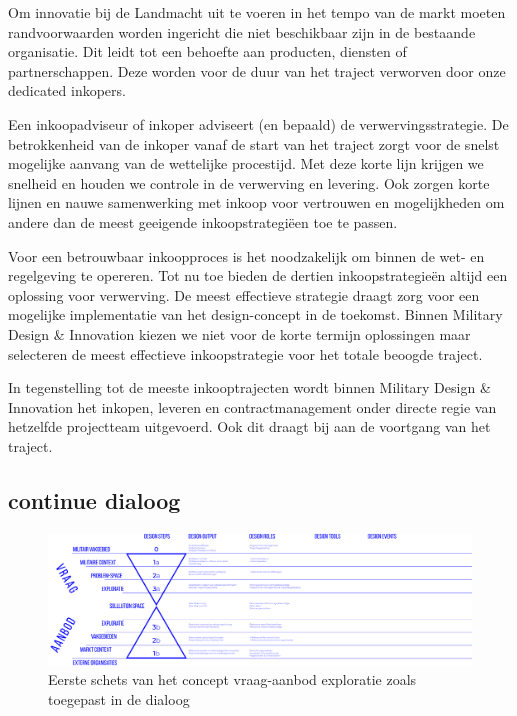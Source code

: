 \documentclass[
]{book}
\begin{document}
Om innovatie bij de Landmacht uit te voeren in het tempo van de markt moeten randvoorwaarden worden ingericht die niet beschikbaar zijn in de bestaande organisatie. Dit leidt tot een behoefte aan producten, diensten of partnerschappen. Deze worden voor de duur van het traject verworven door onze dedicated inkopers.

Een inkoopadviseur of inkoper adviseert (en bepaald) de verwervingsstrategie. De betrokkenheid van de inkoper vanaf de start van het traject zorgt voor de snelst mogelijke aanvang van de wettelijke procestijd. Met deze korte lijn krijgen we snelheid en houden we controle in de verwerving en levering. Ook zorgen korte lijnen en nauwe samenwerking met inkoop voor vertrouwen en mogelijkheden om andere dan de meest geeigende inkoopstrategiëen toe te passen.

Voor een betrouwbaar inkoopproces is het noodzakelijk om binnen de wet- en regelgeving te opereren. Tot nu toe bieden de dertien inkoopstrategieën altijd een oplossing voor verwerving. De meest effectieve strategie draagt zorg voor een mogelijke implementatie van het design-concept in de toekomst. Binnen Military Design \& Innovation kiezen we niet voor de korte termijn oplossingen maar selecteren de meest effectieve inkoopstrategie voor het totale beoogde traject.

In tegenstelling tot de meeste inkooptrajecten wordt binnen Military Design \& Innovation het inkopen, leveren en contractmanagement onder directe regie van hetzelfde projectteam uitgevoerd. Ook dit draagt bij aan de voortgang van het traject.

\hypertarget{continue-dialoog}{%
\subsection{continue dialoog}\label{continue-dialoog}}

\begin{figure}

{\centering \includegraphics[width=0.6\linewidth]{data/images/20200426-CDE-designproces_vraag-aanbod-exploratie_blauwdruk-v2} 

}

\caption{Eerste schets van het concept vraag-aanbod exploratie zoals toegepast in de dialoog }\label{fig:vraag-aanbod}
\end{figure}
\end{document}
